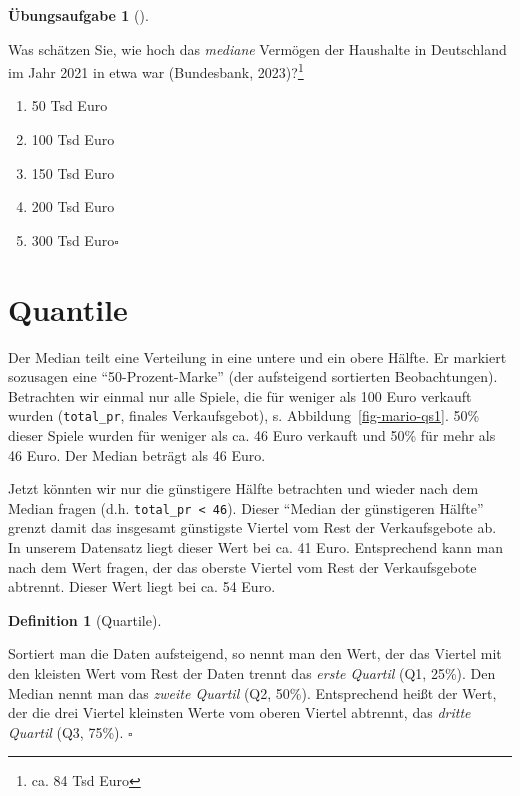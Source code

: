\documentclass[
  letterpaper,
  twoside,
  open=any]{scrbook}
\providecommand{\tightlist}{%
  \setlength{\itemsep}{0pt}\setlength{\parskip}{0pt}}\usepackage{longtable,booktabs,array}
\theoremstyle{definition}
\newtheorem{exercise}{Übungsaufgabe}[chapter]
\theoremstyle{definition}
\theoremstyle{definition}
\newtheorem{definition}{Definition}[chapter]
\theoremstyle{remark}
\begin{document}
\begin{exercise}[]\protect\hypertarget{exr-mw-wealthmd}{}\label{exr-mw-wealthmd}

Was schätzen Sie, wie hoch das \emph{mediane} Vermögen der Haushalte in
Deutschland im Jahr 2021 in etwa war (Bundesbank, 2023)?\footnote{ca. 84
  Tsd Euro}

\begin{enumerate}
\def\labelenumi{\alph{enumi})}
\tightlist
\item
  50 Tsd Euro
\item
  100 Tsd Euro
\item
  150 Tsd Euro
\item
  200 Tsd Euro
\item
  300 Tsd Euro\(\square\)
\end{enumerate}

\end{exercise}

\section{Quantile}\label{quantile}

Der Median teilt eine Verteilung in eine untere und ein obere Hälfte. Er
markiert sozusagen eine \enquote{50-Prozent-Marke} (der aufsteigend
sortierten Beobachtungen). Betrachten wir einmal nur alle Spiele, die
für weniger als 100 Euro verkauft wurden (\texttt{total\_pr}, finales
Verkaufsgebot), s. Abbildung~\ref{fig-mario-qs1}. 50\% dieser Spiele
wurden für weniger als ca. 46 Euro verkauft und 50\% für mehr als 46
Euro. Der Median beträgt als 46 Euro.

Jetzt könnten wir nur die günstigere Hälfte betrachten und wieder nach
dem Median fragen (d.h. \texttt{total\_pr\ \textless{}\ 46}). Dieser
\enquote{Median der günstigeren Hälfte} grenzt damit das insgesamt
günstigste Viertel vom Rest der Verkaufsgebote ab. In unserem Datensatz
liegt dieser Wert bei ca. 41 Euro. Entsprechend kann man nach dem Wert
fragen, der das oberste Viertel vom Rest der Verkaufsgebote abtrennt.
Dieser Wert liegt bei ca. 54 Euro.

\begin{definition}[Quartile]\protect\hypertarget{def-quartile}{}\label{def-quartile}

Sortiert man die Daten aufsteigend, so nennt man den Wert, der das
Viertel mit den kleisten Wert vom Rest der Daten trennt das \emph{erste
Quartil} (Q1, 25\%). Den Median nennt man das \emph{zweite Quartil} (Q2,
50\%). Entsprechend heißt der Wert, der die drei Viertel kleinsten Werte
vom oberen Viertel abtrennt, das \emph{dritte Quartil} (Q3, 75\%).
\(\square\)

\end{definition}
\end{document}
